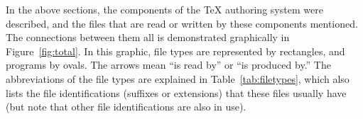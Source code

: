 In the above sections, the components of the \TeX{} authoring system 
were described, and the files that are read or written by these
components mentioned. The connections between them all is 
demonstrated graphically in Figure~\ref{fig:total}. In this graphic,
file types are represented by rectangles, and programs by ovals. The
arrows mean ``is read by'' or ``is produced by.'' The abbreviations
of the file types are explained in Table~\ref{tab:filetypes}, which
also lists the file identifications (suffixes or extensions) that
these files usually have (but note that  other file identifications
are also in use).

\begin{figure} 
\begin{center} 
%  

%
%



\ifx \OutputInFigtotal\undefined
   \def\OutputInFigtotal{output}
\fi
\ifx \DriverInFigtotal\undefined
   \def\DriverInFigtotal{\DVI{} driver}
\fi



\def\file#1{\framebox(3,2){\tt \uppercase{#1}}}
\def\prog(#1)#2{%
   \oval(#1,2)%
   \makebox(0,0){#2}%
   }



\newcount\X \newcount\Y		%


\def\File(#1,#2)#3{%
  \put(#1,#2){\framebox(20,10){\tt\uppercase{#3}}}}
\def\CopyFile(#1,#2)#3{%
  \put(#1,#2){\dashbox{2}(20,10){#3}}}
\def\Program(#1,#2)#3{%
  \X=#1 \Y=#2 \advance\X by 15 \advance\Y by 5
  \put(\X,\Y){\oval(30,10)}%
  \put(#1,#2){\makebox(30,10){#3}}}
\def\Device(#1,#2)#3{%
  \put(#1,#2){\line(1,2){5}} \put(#1,#2){\line(1,0){25}}
  \X=#1 \Y=#2 \advance\X by 30 \advance\Y by 10
  \put(\the\X,\the\Y){\line(-1,-2){5}} \put(\the\X,\the\Y){\line(-1,0){25}}
  \put(#1,#2){\makebox(30,10){#3}}}



\end{center}
\end{figure}

